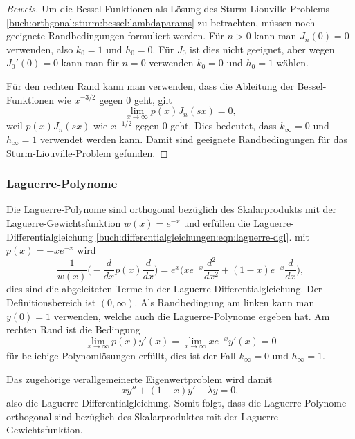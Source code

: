 \begin{proof}[Beweis]
Um die Bessel-Funktionen als Lösung des Sturm-Liouville-Problems
\eqref{buch:orthgonal:sturm:bessel:lambdaparams}
zu betrachten, müssen noch geeignete Randbedingungen formuliert werden.
Für $n>0$ kann man 
$J_n(0)=0$ verwenden, also $k_0=1$ und $h_0=0$.
Für $J_0$ ist dies nicht geeignet, aber wegen $J_0'(0)=0$ kann
man für $n=0$ verwenden $k_0=0$ und $h_0=1$ wählen.

Für den rechten Rand kann man verwenden, dass die Ableitung der
Bessel-Funktionen wie $x^{-3/2}$ gegen $0$ geht, gilt
\[
\lim_{x\to\infty} p(x) J_n(sx) = 0,
\]
weil $p(x)J_n(sx)$ wie $x^{-1/2}$ gegen $0$ geht.
Dies bedeutet, dass $k_\infty=0$ und $h_\infty=1$
verwendet werden kann.
Damit sind geeignete Randbedingungen für das Sturm-Liouville-Problem
gefunden.
\end{proof}

%
%
\subsubsection{Laguerre-Polynome}
Die Laguerre-Polynome sind orthogonal bezüglich des Skalarprodukts
mit der Laguerre-Gewichtsfunktion $w(x)=e^{-x}$ und erfüllen die
Laguerre-Differentialgleichung
\eqref{buch:differentialgleichungen:eqn:laguerre-dgl}.
mit $p(x)=-xe^{-x}$ wird 
\[
\frac{1}{w(x)}
\biggl(
-
\frac{d}{dx} p(x) \frac{d}{dx}
\biggr)
=
e^x \biggl(xe^{-x}\frac{d^2}{dx^2} + (1-x)e^{-x}\frac{d}{dx}\biggr),
\]
dies sind die abgeleiteten Terme in der Laguerre-Differentialgleichung.
Der Definitionsbereich ist $(0,\infty)$.
Als Randbedingung am linken kann man $y(0)=1$ verwenden, welche
auch die Laguerre-Polynome ergeben hat.
Am rechten Rand ist die Bedingung
\[
\lim_{x\to\infty} p(x)y'(x)
=
\lim_{x\to\infty} xe^{-x} y'(x)
=
0
\]
für beliebige Polynomlösungen erfüllt, dies ist der Fall
$k_{\infty}=0$ und $h_\infty=1$.

Das zugehörige verallgemeinerte Eigenwertproblem  wird damit
\[
xy'' + (1-x)y' - \lambda y = 0,
\]
also die Laguerre-Differentialgleichung.
Somit folgt, dass die Laguerre-Polynome orthogonal sind bezüglich
des Skalarproduktes mit der Laguerre-Gewichtsfunktion.

%
%
